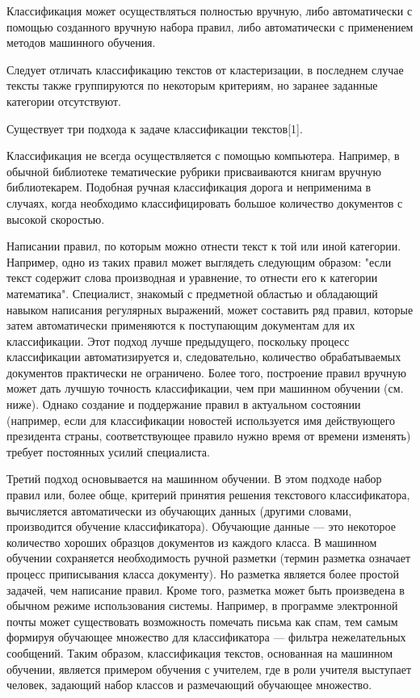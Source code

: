 Классификация может осуществляться полностью вручную, либо автоматически с помощью созданного вручную набора правил, либо автоматически с применением методов машинного обучения.

Следует отличать классификацию текстов от кластеризации, в последнем случае тексты также группируются по некоторым критериям, но заранее заданные категории отсутствуют.

Существует три подхода к задаче классификации текстов[1].

Классификация не всегда осуществляется с помощью компьютера. Например, в обычной библиотеке тематические рубрики присваиваются книгам вручную библиотекарем. Подобная ручная классификация дорога и неприменима в случаях, когда необходимо классифицировать большое количество документов с высокой скоростью.

Написании правил, по которым можно отнести текст к той или иной категории. Например, одно из таких правил может выглядеть следующим образом: "если текст содержит слова производная и уравнение, то отнести его к категории математика". Специалист, знакомый с предметной областью и обладающий навыком написания регулярных выражений, может составить ряд правил, которые затем автоматически применяются к поступающим документам для их классификации. Этот подход лучше предыдущего, поскольку процесс классификации автоматизируется и, следовательно, количество обрабатываемых документов практически не ограничено. Более того, построение правил вручную может дать лучшую точность классификации, чем при машинном обучении (см. ниже). Однако создание и поддержание правил в актуальном состоянии (например, если для классификации новостей используется имя действующего президента страны, соответствующее правило нужно время от времени изменять) требует постоянных усилий специалиста.

Третий подход основывается на машинном обучении. В этом подходе набор правил или, более обще, критерий принятия решения текстового классификатора, вычисляется автоматически из обучающих данных (другими словами, производится обучение классификатора). Обучающие данные — это некоторое количество хороших образцов документов из каждого класса. В машинном обучении сохраняется необходимость ручной разметки (термин разметка означает процесс приписывания класса документу). Но разметка является более простой задачей, чем написание правил. Кроме того, разметка может быть произведена в обычном режиме использования системы. Например, в программе электронной почты может существовать возможность помечать письма как спам, тем самым формируя обучающее множество для классификатора — фильтра нежелательных сообщений. Таким образом, классификация текстов, основанная на машинном обучении, является примером обучения с учителем, где в роли учителя выступает человек, задающий набор классов и размечающий обучающее множество.


